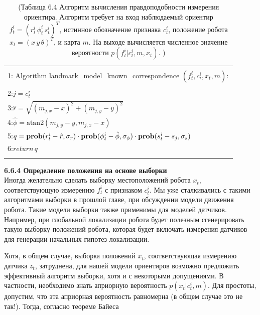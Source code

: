 \documentclass[10pt,a4paper]{article}
\begin{document}
\begin{table}[H]
\begin{center}
\begin{tabular}{|l|}
\hline
{}\\
1: \hspace{3mm} Algorithm landmark\_model\_known\_correspondence $(f_t^i,c_t^i,x_t,m):$ \\
{}\\
2:\hspace{7mm}$j=c_t^i$\\
3:\hspace{7mm}$\hat{r}=\sqrt{(m_{j,x}-x)^2+(m_{j,y}-y)^2}$\\
4:\hspace{7mm}$\hat{\phi}=\text{atan}2(m_{j,y}-y,m_{j,x}-x)$\\
5:\hspace{7mm}$q=\text{\textbf{prob}}(r_t^i-\hat{r},\sigma_r)\cdot\text{\textbf{prob}}(\phi_t^i-\hat{\phi},\sigma_\phi)\cdot\text{\textbf{prob}}(s_t^i-s_j,\sigma_s)$\\
6:\hspace{7mm}$\textit{return}\,q$\\
{}\\
\hline
\end{tabular}
\caption{(Таблица 6.4 Алгоритм вычисления правдоподобности измерения ориентира. Алгоритм требует на вход наблюдаемый ориентир $f_t^i = (r_t^i\,\phi^i_t\, s^i_t)^T$, истинное обозначение признака $c^i_t$, положение робота $x_t = (x\,y\,\theta)^T$, и карта $m$. На выходе вычисляется численное значение вероятности $p(f_t^i | c^i_t, m, x_t)$. )}
\end{center}
\end{table}

\textbf{6.6.4 Определение положения на основе выборки}\\

Иногда желательно сделать выборку местоположений робота $x_t$, соответствующую измерению $f_t^i$ с признаком $c^i_t$. Мы уже сталкивались с такими алгоритмами выборки в прошлой главе, при обсуждении модели движения робота. Такие модели выборки также применимы для моделей датчиков. Например, при глобальной локализации робота будет полезным сгенерировать такую выборку положений робота, которая будет включать измерения датчиков для генерации начальных гипотез локализации. 

Хотя, в общем случае, выборка положений  $x_t$, соответствующая измерению датчика $z_t$, затруднена, для нашей модели ориентиров возможно предложить эффективный алгоритм выборки, хотя и с некоторыми допущениями. В частности, необходимо знать априорную вероятность $p(x_t |c^i_t, m)$. Для простоты, допустим, что эта априорная вероятность равномерна (в общем случае это не так!).
Тогда, согласно теореме Байеса\\
\end{document}
